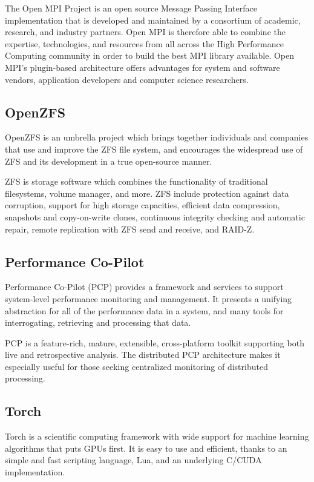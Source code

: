 \documentclass[letterpaper]{report}
\begin{document}
The Open MPI Project is an open source Message Passing Interface
implementation that is developed and maintained by a consortium of
academic, research, and industry partners. Open MPI is therefore able to
combine the expertise, technologies, and resources from all across the
High Performance Computing community in order to build the best MPI
library available. Open MPI's plugin-based architecture offers
advantages for system and software vendors, application developers and
computer science researchers.

\subsection{OpenZFS}

OpenZFS is an umbrella project which brings together individuals and
companies that use and improve the ZFS file system, and encourages the
widespread use of ZFS and its development in a true open-source manner.

ZFS is storage software which combines the functionality of traditional
filesystems, volume manager, and more. ZFS include protection against
data corruption, support for high storage capacities, efficient data
compression, snapshots and copy-on-write clones, continuous integrity
checking and automatic repair, remote replication with ZFS send and
receive, and RAID-Z.

\subsection{Performance Co-Pilot}

Performance Co-Pilot (PCP) provides a framework and services to support
system-level performance monitoring and management. It presents a
unifying abstraction for all of the performance data in a system, and
many tools for interrogating, retrieving and processing that data.

PCP is a feature-rich, mature, extensible, cross-platform toolkit
supporting both live and retrospective analysis. The distributed PCP
architecture makes it especially useful for those seeking centralized
monitoring of distributed processing.

\subsection{Torch}

Torch is a scientific computing framework with wide support for machine
learning algorithms that puts GPUs first. It is easy to use and
efficient, thanks to an simple and fast scripting language, Lua, and an
underlying C/CUDA implementation.
\end{document}
